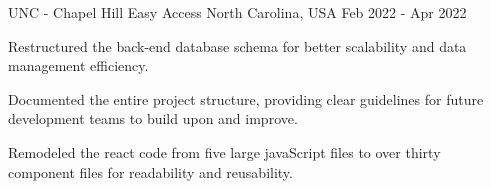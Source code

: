 \begin{cventries}

  \cventry
    {UNC - Chapel Hill} %
    {Easy Access} %
    {North Carolina, USA} %
    {Feb 2022 - Apr 2022} %
    {
      \begin{cvitems} %
        \item {Restructured the back-end database schema for better scalability and data management efficiency.}
        \item {Documented the entire project structure, providing clear guidelines for future development teams to build upon and improve.}
        \item {Remodeled the react code from five large javaScript files to over thirty component files for readability and reusability.}
      \end{cvitems}
    }

\end{cventries}
